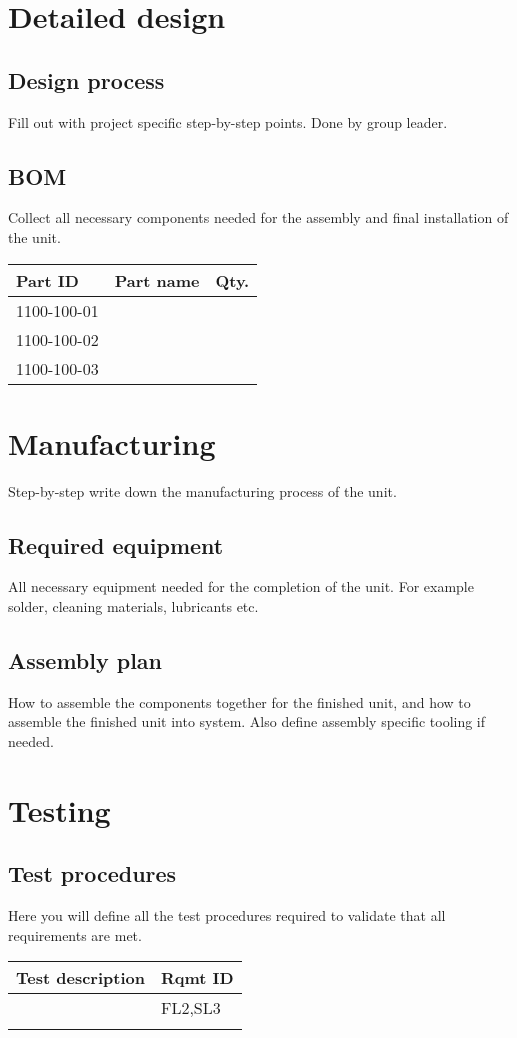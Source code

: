 \documentclass[12pt,a4paper]{article}
\begin{document}
	\section*{Detailed design}
		\subsection*{Design process}
			Fill out with project specific step-by-step points. Done by group leader.
		\subsection*{BOM}
			Collect all necessary components needed for the assembly and final installation of the unit.
			\begin{table}[H]
				\centering
				\begin{tabular}{|l|l|l|}
					\hline
					\textbf{Part ID}& \textbf{Part name} & \textbf{Qty.} \\
					\hline
					1100-100-01&  &  \\
					\hline
					1100-100-02&  &  \\
					\hline
					1100-100-03&  &  \\
					\hline
				\end{tabular}
			\end{table}
	\section*{Manufacturing}
		Step-by-step write down the manufacturing process of the unit.
		
		\subsection*{Required equipment}
			All necessary equipment needed for the completion of the unit. For example solder, cleaning materials, lubricants etc.
		\subsection*{Assembly plan}
			How to assemble the components together for the finished unit, and how to assemble the finished unit into system. Also define assembly specific tooling if needed.
	\section*{Testing}
		\subsection*{Test procedures}
			Here you will define all the test procedures required to validate that all requirements are met.
			\begin{table}[H]
				\centering
				\begin{tabular}{|l|l|}
					\hline
					\textbf{Test description}& \textbf{Rqmt ID}  \\
					\hline
					&  FL2,SL3  \\
					\hline
					&    \\
					\hline				
				\end{tabular}
			\end{table}
\end{document}
